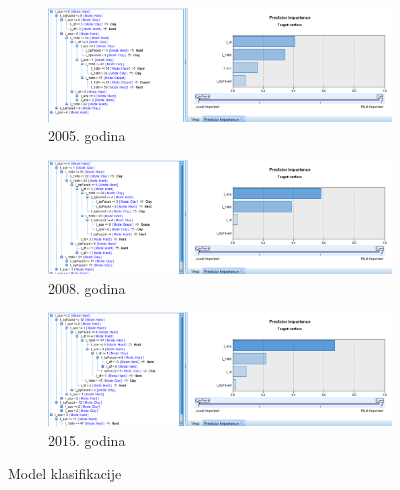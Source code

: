 \documentclass[a4paper]{article}
\begin{document}
\begin{figure}[H]
	\begin{subfigure}[h]{\textwidth}
		\begin{center}
			\includegraphics[scale=0.50]{Klasifikacija/C50/Model_Surface2005.png}
		\end{center}
		\caption{2005. godina}
		\label{fig:ModelKlasifikacijaC502005}
	\end{subfigure}
	
	\vspace{0.5cm}
	\begin{subfigure}[h]{\textwidth}
		\begin{center}
			\includegraphics[scale=0.50]{Klasifikacija/C50/Model_Surface2008.png}
		\end{center}
		\caption{2008. godina}
		\label{fig:ModelKlasifikacijaC502008}
	\end{subfigure}
	
	\vspace{0.5cm}
	\begin{subfigure}[h]{\textwidth}
		\begin{center}
			\includegraphics[scale=0.50]{Klasifikacija/C50/Model_Surface2015.png}
		\end{center}
		\caption{2015. godina}
		\label{fig:ModelKlasifikacijaC502015}
	\end{subfigure}
	
	\caption{Model klasifikacije}
	\label{fig:ModelKlasifikacijaC50}
\end{figure}
\end{document}
